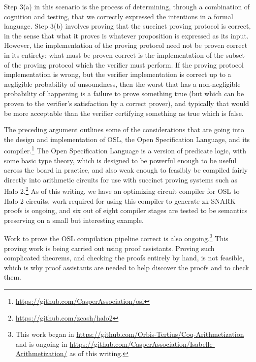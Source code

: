 \documentclass[11pt]{article}
\begin{document}
Step 3(a) in this scenario is the process of determining,
through a combination of cognition and testing, that we correctly expressed the
intentions in a formal language. Step 3(b) involves proving that the succinct
proving protocol is correct, in the sense that what it proves is whatever proposition
is expressed as its input. However, the implementation of the proving protocol need
not be proven correct in its entirety; what must be proven correct is the implementation
of the subset of the proving protocol which the verifier must perform. If the proving
protocol implementation is wrong, but the verifier implementation is correct up to a
negligible probability of unsoundness, then the worst that has a non-negligible probability
of happening is a failure to prove something true (but which can be proven to the
verifier's satisfaction by a correct prover), and typically that would be more acceptable than
the verifier certifying something as true which is false.

The preceding argument outlines some of the considerations that are going into the
design and implementation of OSL, the Open Specification Language, and its
compiler.\footnote{\url{https://github.com/CasperAssociation/osl}}
The Open Specification Language is a version of predicate logic, with some basic type theory,
which is designed to be powerful enough to be useful across the board in practice, and also weak enough
to feasibly be compiled fairly directly into arithmetic circuits
for use with succinct proving systems such as Halo 2.\footnote{\url{https://github.com/zcash/halo2}}
As of this writing, we have an optimizing circuit compiler for OSL to Halo 2 circuits,
work required for using this compiler to generate zk-SNARK proofs is ongoing, and
six out of eight compiler stages are tested to be semantics preserving on a small
but interesting example.

Work to prove the OSL compilation pipeline correct is also ongoing.\footnote{This work began in
\url{https://github.com/Orbis-Tertius/Coq-Arithmetization} and is ongoing in
\url{https://github.com/CasperAssociation/Isabelle-Arithmetization/} as of this writing.}
This proving work is being carried out using proof assistants. Proving such complicated
theorems, and checking the proofs entirely by hand, is not feasible, which is why proof
assistants are needed to help discover the proofs and to check them.
\end{document}
